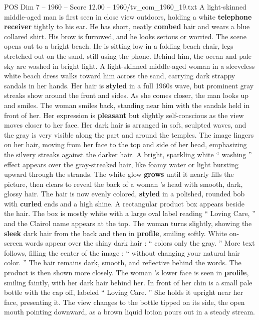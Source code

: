 \begin{textsample}{POS Dim 7 – 1960 – Score 12.00 – 1960/tv\_com\_1960\_19.txt}  \label{ex:f7_pos_027}
A light-skinned middle-aged man is first seen in close view outdoors, holding a white \textbf{telephone} \textbf{receiver} tightly to his ear.
He has short, neatly \textbf{combed} hair and wears a blue collared shirt.
His brow is furrowed, and he looks serious or worried.
The scene opens out to a bright beach.
He is sitting low in a folding beach chair, legs stretched out on the sand, still using the phone.
Behind him, the ocean and pale sky are washed in bright light.
A light-skinned middle-aged woman in a sleeveless white beach dress walks toward him across the sand, carrying dark strappy sandals in her hands.
Her hair is \textbf{styled} in a full 1960s wave, but prominent gray streaks show around the front and sides.
As she comes closer, the man looks up and smiles.
The woman smiles back, standing near him with the sandals held in front of her.
Her expression is \textbf{pleasant} but slightly self-conscious as the view moves closer to her face.
Her dark hair is arranged in soft, sculpted waves, and the gray is very visible along the part and around the temples.
The image lingers on her hair, moving from her face to the top and side of her head, emphasizing the silvery streaks against the darker hair.
A bright, sparkling white “ washing ” effect appears over the gray-streaked hair, like foamy water or light bursting upward through the strands.
The white glow \textbf{grows} until it nearly fills the picture, then clears to reveal the back of a woman ’s head with smooth, dark, glossy hair.
The hair is now evenly colored, \textbf{styled} in a polished, rounded bob with \textbf{curled} ends and a high shine.
A rectangular product box appears beside the hair.
The box is mostly white with a large oval label reading “ Loving Care, ” and the Clairol name appears at the top.
The woman turns slightly, showing the \textbf{sleek} dark hair from the back and then in \textbf{profile}, smiling softly.
White on-screen words appear over the shiny dark hair : “ colors only the gray. ” More text follows, filling the center of the image : “ without changing your natural hair color. ” The hair remains dark, smooth, and reflective behind the words.
The product is then shown more closely.
The woman ’s lower face is seen in \textbf{profile}, smiling faintly, with her dark hair behind her.
In front of her chin is a small pale bottle with the cap off, labeled “ Loving Care. ” She holds it upright near her face, presenting it.
The view changes to the bottle tipped on its side, the open mouth pointing downward, as a brown liquid lotion pours out in a steady stream.

\end{textsample}

